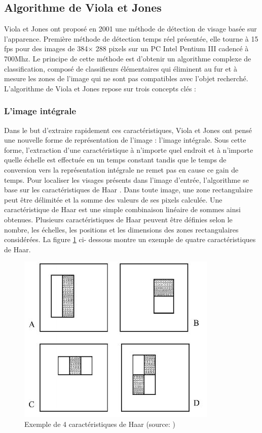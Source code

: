 \subsection{Algorithme de Viola et Jones}
	Viola et Jones ont proposé en 2001 \citet{VIO} une méthode de détection de visage basée sur l'apparence. Première méthode de détection temps réel présentée, elle tourne à 15 fps pour des images de 384$\times$ 288 pixels sur un PC Intel Pentium III cadencé à 700Mhz. Le principe de cette  méthode  est d'obtenir  un  algorithme  complexe  de  classification,  composé  de classifieurs élémentaires qui éliminent au fur et à mesure les zones de l'image qui ne sont pas  compatibles  avec  l'objet  recherché. L'algorithme de Viola et Jones repose sur trois concepts clés : 
	\subsubsection{L'image intégrale}
	Dans le but d'extraire rapidement ces caractéristiques, Viola et Jones ont pensé une nouvelle forme de représentation de l'image : l'image intégrale. Sous cette forme, l'extraction d'une caractéristique à n'importe quel endroit et à n'importe quelle échelle est effectuée en un temps constant tandis que le temps de conversion vers la représentation intégrale ne remet pas en cause ce gain de temps. Pour localiser les visages présents dans l'image d'entrée, l'algorithme se base sur les caractéristiques de Haar \citep{VIO,MAT}. Dans toute image, une zone rectangulaire peut être délimitée et la somme des valeurs de ses pixels calculée. Une caractéristique de Haar est une simple combinaison linéaire de sommes ainsi obtenues. Plusieurs caractéristiques de Haar peuvent être définies selon le nombre, les échelles, les positions et les dimensions des zones rectangulaires considérées. La figure \ref{fig:haar} ci- dessous montre un exemple de quatre caractéristiques de Haar.
	
	\begin{figure}[htbp]
		\centering
			\includegraphics{haar.JPG}
		\caption[Exemple de 4 caractéristiques de Haar]{Exemple de 4 caractéristiques de Haar (source: \citep{VIO})}
		\label{fig:haar}
	\end{figure}
	
